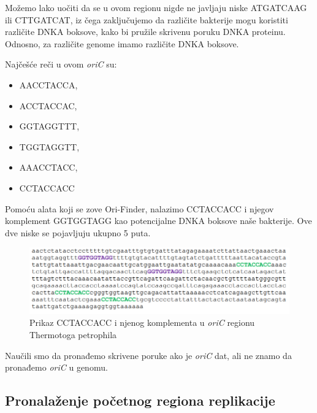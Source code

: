 Možemo lako uočiti da se u ovom regionu nigde ne javljaju niske ATGATCAAG ili CTTGATCAT, iz čega zaključujemo da različite bakterije mogu koristiti različite DNKA boksove, kako bi pružile skrivenu poruku DNKA proteinu. Odnosno, za različite genome imamo različite DNKA boksove.

Najčešće reči u ovom \textit{oriC} su:
\begin{itemize}
	\item AACCTACCA, 
	\item ACCTACCAC,
	\item GGTAGGTTT,
	\item TGGTAGGTT,
	\item AAACCTACC,
	\item CCTACCACC
\end{itemize}

Pomoću alata koji se zove Ori-Finder, nalazimo CCTACCACC i njegov komplement GGTGGTAGG kao potencijalne DNKA boksove naše bakterije. Ove dve niske se pojavljuju ukupno 5 puta.

\begin{figure}[h]
\caption{Prikaz CCTACCACC i njenog komplementa u \textit{oriC} regionu Thermotoga petrophila}
\centering
\includegraphics[width=1\textwidth]{poglavlja/1/slike/TP.png}
\end{figure} 
Naučili smo da pronađemo skrivene poruke ako je \textit{oriC}
dat, ali ne znamo da pronađemo \textit{oriC} u genomu.

\subsection{Pronalaženje početnog regiona replikacije}

